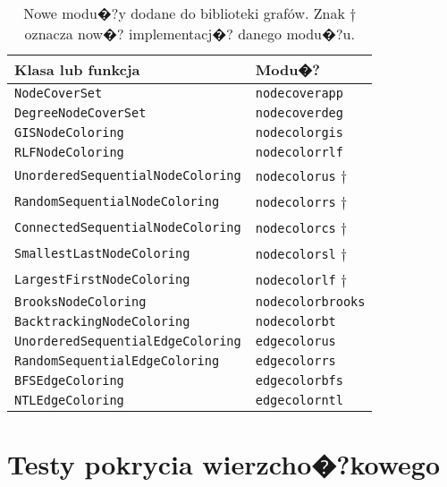 \documentclass[12pt,a4paper]{mwrep}
\begin{document}
\begin{table}
\centering
\caption[Nowe modu�?y dodane do biblioteki grafów.]{
Nowe modu�?y dodane do biblioteki grafów.
Znak $\dagger$ oznacza now�? implementacj�? danego modu�?u.
\label{tab:new_modules}}
\begin{tabular}{|l|l|}
\hline 
\textbf{Klasa lub funkcja}   & \textbf{Modu�?}  \\
\hline 
\lstinline|NodeCoverSet|  &  \lstinline|nodecoverapp|  \\
\hline 
\lstinline|DegreeNodeCoverSet| &  \lstinline|nodecoverdeg| \\
\hline 
\lstinline|GISNodeColoring|  &  \lstinline|nodecolorgis|  \\
\hline 
\lstinline|RLFNodeColoring|  &  \lstinline|nodecolorrlf|  \\
\hline 
\lstinline|UnorderedSequentialNodeColoring|  &  \lstinline|nodecolorus| $\dagger$ \\
\hline 
\lstinline|RandomSequentialNodeColoring|  &  \lstinline|nodecolorrs| $\dagger$ \\
\hline 
\lstinline|ConnectedSequentialNodeColoring|  &  \lstinline|nodecolorcs| $\dagger$ \\
\hline 
\lstinline|SmallestLastNodeColoring|  &  \lstinline|nodecolorsl| $\dagger$ \\
\hline 
\lstinline|LargestFirstNodeColoring|  &  \lstinline|nodecolorlf| $\dagger$ \\
\hline 
\lstinline|BrooksNodeColoring|  &  \lstinline|nodecolorbrooks|  \\
\hline 
\lstinline|BacktrackingNodeColoring|  &  \lstinline|nodecolorbt|  \\
\hline 
\lstinline|UnorderedSequentialEdgeColoring|  &  \lstinline|edgecolorus|  \\
\hline 
\lstinline|RandomSequentialEdgeColoring|  &  \lstinline|edgecolorrs|  \\
\hline 
\lstinline|BFSEdgeColoring|  &  \lstinline|edgecolorbfs|  \\
\hline 
\lstinline|NTLEdgeColoring|  &  \lstinline|edgecolorntl|  \\
\hline 
\end{tabular}
\end{table}


\chapter{Testy pokrycia wierzcho�?kowego}
\label{app:test_vertex_cover}
\end{document}
